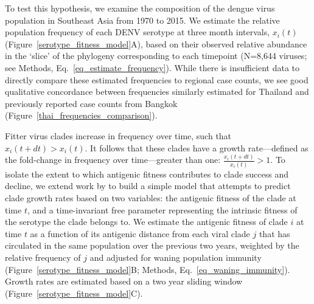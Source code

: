\documentclass[11pt,oneside,letterpaper]{article}
\begin{document}
To test this hypothesis, we examine the composition of the dengue virus population in Southeast Asia from 1970 to 2015.
We estimate the relative population frequency of each DENV serotype at three month intervals, $x_i(t)$ (Figure~\ref{serotype_fitness_model}A), based on their observed relative abundance in the `slice' of the phylogeny corresponding to each timepoint (N=8,644 viruses; see Methods, Eq.~\ref{eq_estimate_frequency}).
While there is insufficient data to directly compare these estimated frequencies to regional case counts, we see good qualitative concordance between frequencies similarly estimated for Thailand and previously reported case counts from Bangkok (Figure~\ref{thai_frequencies_comparison}).

Fitter virus clades increase in frequency over time, such that $x_i(t+dt) > x_i(t)$.
It follows that these clades have a growth rate---defined as the fold-change in frequency over time---greater than one: $\frac{x_i(t+dt)}{x_i(t)} > 1$.
To isolate the extent to which antigenic fitness contributes to clade success and decline, we extend work by \citet{luksza2014predictive} to build a simple model that attempts to predict clade growth rates based on two variables: the antigenic fitness of the clade at time $t$, and a time-invariant free parameter representing the intrinsic fitness of the serotype the clade belongs to.
We estimate the antigenic fitness of clade $i$ at time $t$ as a function of its antigenic distance from each viral clade $j$ that has circulated in the same population over the previous two years, weighted by the relative frequency of $j$ and adjusted for waning population immunity (Figure~\ref{serotype_fitness_model}B; Methods, Eq.~\ref{eq_waning_immunity}).
Growth rates are estimated based on a two year sliding window (Figure~\ref{serotype_fitness_model}C).
\end{document}
